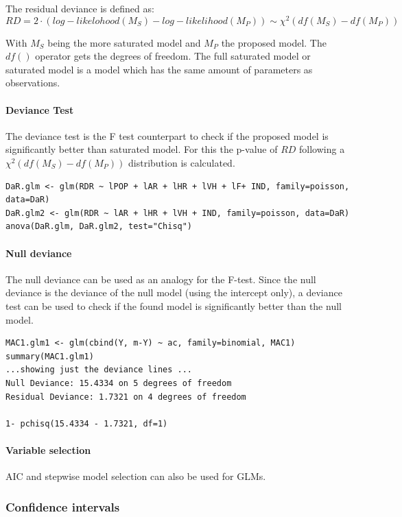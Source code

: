 The residual deviance is defined as:
\begin{equation*}
RD = 2\cdot (log-likelohood(M_S) - log-likelihood(M_P)) \sim \chi^2(df(M_S) - df(M_P))
\end{equation*}

With $M_S$ being the more saturated model and $M_P$ the proposed model. The $df()$ operator gets the degrees of freedom. The full saturated model or saturated model is a model which has the same amount of parameters as observations.

\paragraph{Deviance Test}
The deviance test is the F test counterpart to check if the proposed model is significantly better than saturated model. For this the p-value of $RD$ following a  $\chi^2(df(M_S) - df(M_P))$ distribution is calculated.

\begin{lstlisting}
DaR.glm <- glm(RDR ~ lPOP + lAR + lHR + lVH + lF+ IND, family=poisson,
data=DaR)
DaR.glm2 <- glm(RDR ~ lAR + lHR + lVH + IND, family=poisson, data=DaR)
anova(DaR.glm, DaR.glm2, test="Chisq")
\end{lstlisting}

\paragraph{Null deviance}
The null deviance can be used as an analogy for the F-test. Since the null deviance is the deviance of the null model (using the intercept only), a deviance test can be used to check if the found model is significantly better than the null model.

\begin{lstlisting}
MAC1.glm1 <- glm(cbind(Y, m-Y) ~ ac, family=binomial, MAC1)
summary(MAC1.glm1)
...showing just the deviance lines ...
Null Deviance: 15.4334 on 5 degrees of freedom
Residual Deviance: 1.7321 on 4 degrees of freedom

1- pchisq(15.4334 - 1.7321, df=1)
\end{lstlisting}

\paragraph{Variable selection}
AIC and stepwise model selection can also be used for GLMs.

\subsubsection{Confidence intervals}

